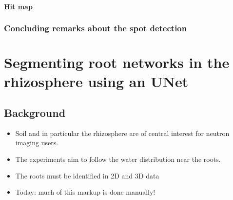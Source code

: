 \documentclass[letterpaper,10pt,english]{sphinxmanual}
\begin{document}
\noindent{}


\subsubsection{Hit map}
\label{\detokenize{ML4NeutronImageSegmentation:hit-map}}
\begin{sphinxVerbatim}[commandchars=\\\{\}]
   

\end{sphinxVerbatim}

\noindent{}


\subsection{Concluding remarks about the spot detection}
\label{\detokenize{ML4NeutronImageSegmentation:concluding-remarks-about-the-spot-detection}}

\chapter{Segmenting root networks in the rhizosphere using an U\sphinxhyphen{}Net}
\label{\detokenize{ML4NeutronImageSegmentation:segmenting-root-networks-in-the-rhizosphere-using-an-u-net}}

\section{Background}
\label{\detokenize{ML4NeutronImageSegmentation:background}}\begin{itemize}
\item {} 
Soil and in particular the rhizosphere are of central interest for neutron imaging users.

\item {} 
The experiments aim to follow the water distribution near the roots.

\item {} 
The roots must be identified in 2D and 3D data

\item {} 
Today: much of this mark\sphinxhyphen{}up is done manually!

\end{itemize}
\end{document}
